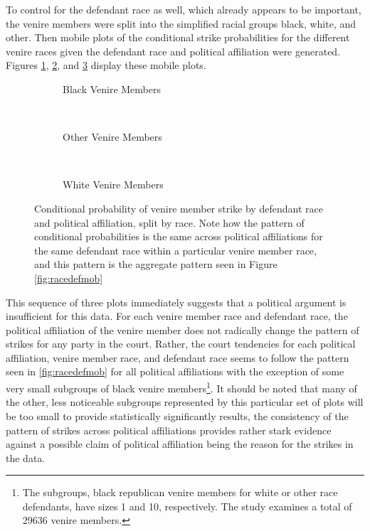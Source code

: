 To control for the defendant race as well, which already appears to be important, the venire members were split into the
simplified racial groups black, white, and other. Then mobile plots of the conditional strike probabilities for the different
venire races given the defendant race and political affiliation were generated. Figures \ref{fig:blackdefpol},
\ref{fig:otherdefpol}, and \ref{fig:whitedefpol} display these mobile plots.

\begin{figure}[h!]
  \centering
  \begin{subfigure}{0.40\textwidth}
    \caption{Black Venire Members}
    \label{fig:blackdefpol}
  \end{subfigure}
  ~
  \begin{subfigure}{0.40\textwidth}
    \caption{Other Venire Members}
    \label{fig:otherdefpol}
  \end{subfigure}
  ~
  \begin{subfigure}{0.40\textwidth}
    \caption{White Venire Members}
    \label{fig:whitedefpol}
  \end{subfigure}
  \caption[Strikes by Political Affiliation, Race, and Defendant Race (Sunshine)]
  {Conditional probability of venire member strike by defendant race and political affiliation, split by race. Note how the
    pattern of conditional probabilities is the same across political affiliations for the same defendant race within a particular
    venire member race, and this pattern is the aggregate pattern seen in Figure \ref{fig:racedefmob}} \label{fig:racedefpol}
\end{figure}

This sequence of three plots immediately suggests that a political argument is insufficient for this data. For each venire member
race and defendant race, the political affiliation of the venire member does not radically change the pattern of strikes for any
party in the court. Rather, the court tendencies for each political affiliation, venire member race, and defendant race seems to
follow the pattern seen in \ref{fig:racedefmob} for all political affiliations with the exception of some very small subgroups of
black venire members\footnote{The subgroups, black republican venire members for white or other race defendants, have sizes 1 and
  10, respectively. The study examines a total of 29636 venire members.}. It should be noted that many of the other, less
noticeable subgroups represented by this particular set of plots will be too small to provide statistically significantly results,
the consistency of the pattern of strikes across political affiliations provides rather stark evidence against a possible claim of
political affiliation being the reason for the strikes in the data.

